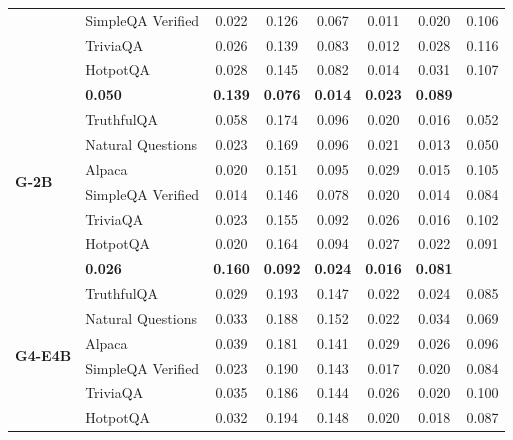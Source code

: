 \begin{table}[ht]
\begin{tabular}{ll cccccc}
        & SimpleQA Verified \cite{haas_simpleqa_2026} & 0.022 & 0.126 & 0.067 & 0.011 & 0.020 & 0.106 \\
        & TriviaQA \cite{joshi2017triviaqa} & 0.026 & 0.139 & 0.083 & 0.012 & 0.028 & 0.116 \\
        & HotpotQA \cite{yang2018hotpotqa} & 0.028 & 0.145 & 0.082 & 0.014 & 0.031 & 0.107 \\
        \rowcolor[gray]{.95} \multicolumn{2}{r}{\textbf{Total SGS}} & \textbf{0.050} & \textbf{0.139} & \textbf{0.076} & \textbf{0.014} & \textbf{0.023} & \textbf{0.089} \\
        \midrule
        \multirow{6}{*}{\textbf{G-2B}}
        & TruthfulQA \cite{lin2022truthfulqa} & 0.058 & 0.174 & 0.096 & 0.020 & 0.016 & 0.052 \\
        & Natural Questions \cite{kwiatkowski2019natural} & 0.023 & 0.169 & 0.096 & 0.021 & 0.013 & 0.050 \\
        & Alpaca \cite{taori2023stanford-alpaca} & 0.020 & 0.151 & 0.095 & 0.029 & 0.015 & 0.105 \\
        & SimpleQA Verified \cite{haas_simpleqa_2026} & 0.014 & 0.146 & 0.078 & 0.020 & 0.014 & 0.084 \\
        & TriviaQA \cite{joshi2017triviaqa} & 0.023 & 0.155 & 0.092 & 0.026 & 0.016 & 0.102 \\
        & HotpotQA \cite{yang2018hotpotqa} & 0.020 & 0.164 & 0.094 & 0.027 & 0.022 & 0.091 \\
        \rowcolor[gray]{.95} \multicolumn{2}{r}{\textbf{Total SGS}} & \textbf{0.026} & \textbf{0.160} & \textbf{0.092} & \textbf{0.024} & \textbf{0.016} & \textbf{0.081} \\
        \midrule
        \multirow{6}{*}{\textbf{G4-E4B}}
        & TruthfulQA \cite{lin2022truthfulqa} & 0.029 & 0.193 & 0.147 & 0.022 & 0.024 & 0.085 \\
        & Natural Questions \cite{kwiatkowski2019natural} & 0.033 & 0.188 & 0.152 & 0.022 & 0.034 & 0.069 \\
        & Alpaca \cite{taori2023stanford-alpaca} & 0.039 & 0.181 & 0.141 & 0.029 & 0.026 & 0.096 \\
        & SimpleQA Verified \cite{haas_simpleqa_2026} & 0.023 & 0.190 & 0.143 & 0.017 & 0.020 & 0.084 \\
        & TriviaQA \cite{joshi2017triviaqa} & 0.035 & 0.186 & 0.144 & 0.026 & 0.020 & 0.100 \\
        & HotpotQA \cite{yang2018hotpotqa} & 0.032 & 0.194 & 0.148 & 0.020 & 0.018 & 0.087 \\

\end{tabular}
\end{table}

